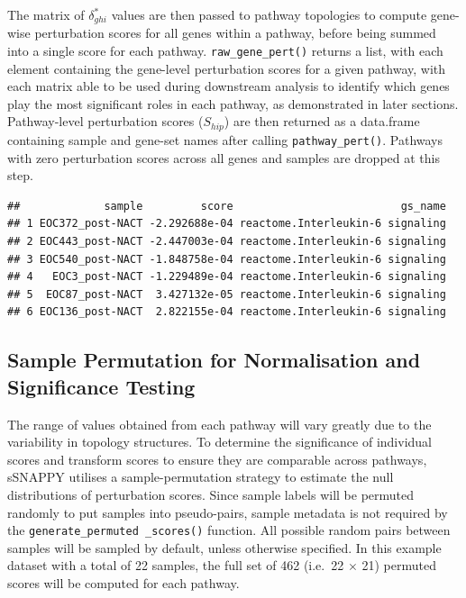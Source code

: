 \documentclass[9pt,a4paper,]{extarticle}
\newenvironment{Shaded}{\begin{snugshade}}{\end{snugshade}}
\newcommand{\FunctionTok}[1]{\textcolor[rgb]{0.13,0.29,0.53}{\textbf{#1}}}
\newcommand{\NormalTok}[1]{#1}
\newcommand{\OtherTok}[1]{\textcolor[rgb]{0.56,0.35,0.01}{#1}}
\newcommand{\SpecialCharTok}[1]{\textcolor[rgb]{0.81,0.36,0.00}{\textbf{#1}}}
\begin{document}
The matrix of \(\delta_{ghi}^*\) values are then passed to pathway topologies to compute gene-wise perturbation scores for all genes within a pathway, before being summed into a single score for each pathway.
\texttt{raw\_gene\_pert()} returns a list, with each element containing the gene-level perturbation scores for a given pathway, with each matrix able to be used during downstream analysis to identify which genes play the most significant roles in each pathway, as demonstrated in later sections.
Pathway-level perturbation scores (\(S_{hip}\)) are then returned as a data.frame containing sample and gene-set names after calling \texttt{pathway\_pert()}.
Pathways with zero perturbation scores across all genes and samples are dropped at this step.

\begin{Shaded}
\end{Shaded}

\begin{verbatim}
##             sample         score                          gs_name
## 1 EOC372_post-NACT -2.292688e-04 reactome.Interleukin-6 signaling
## 2 EOC443_post-NACT -2.447003e-04 reactome.Interleukin-6 signaling
## 3 EOC540_post-NACT -1.848758e-04 reactome.Interleukin-6 signaling
## 4   EOC3_post-NACT -1.229489e-04 reactome.Interleukin-6 signaling
## 5  EOC87_post-NACT  3.427132e-05 reactome.Interleukin-6 signaling
## 6 EOC136_post-NACT  2.822155e-04 reactome.Interleukin-6 signaling
\end{verbatim}

\hypertarget{sample-permutation-for-normalisation-and-significance-testing}{%
\subsection{Sample Permutation for Normalisation and Significance Testing}\label{sample-permutation-for-normalisation-and-significance-testing}}

The range of values obtained from each pathway will vary greatly due to the variability in topology structures.
To determine the significance of individual scores and transform scores to ensure they are comparable across pathways, sSNAPPY utilises a sample-permutation strategy to estimate the null distributions of perturbation scores.
Since sample labels will be permuted randomly to put samples into pseudo-pairs, sample metadata is not required by the \texttt{generate\_permuted\ \_scores()} function.
All possible random pairs between samples will be sampled by default, unless otherwise specified.
In this example dataset with a total of 22 samples, the full set of 462 (i.e.~22 \(\times\) 21) permuted scores will be computed for each pathway.
\end{document}
